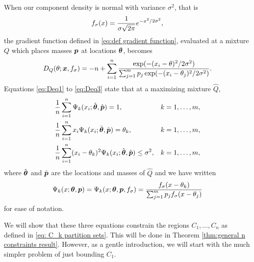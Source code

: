 	When our component density is normal with variance $\sigma^2$, that is
	\begin{equation}
		f_\sigma(x) = \frac{1}{\sigma \sqrt{2\pi}} e^{-x^2/2\sigma^2},
	\end{equation}
	the gradient function defined in \eqref{eq:def gradient function}, evaluated at a mixture $Q$ which places masses ${\bm{{p}}}$ at locations ${\bm{{\theta}}}$, becomes
	\begin{equation}
		D_Q(\theta; {\bm{{x}}}, f_\sigma) = - n + \sum_{i = 1}^n \frac{\exp({-(x_i - \theta)^2/2\sigma^2})}{\sum_{j=1}^m p_j \exp({-(x_i - \theta_j)^2/2\sigma^2})}.
	\end{equation}
	Equations \eqref{eq:Deq1} to \eqref{eq:Deq3} state that at a maximizing mixture $\hat{Q}$, 
	\begin{align}
		&\frac{1}{n} \sum_{i=1}^n \Psi_k(x_i;\hat{{\bm{{\theta}}}},\hat{{\bm{{p}}}}) = 1, &&k = 1,\dots, m, \label{eq:PsiEq1}\\
		&\frac{1}{n} \sum_{i=1}^n x_i \Psi_k(x_i;\hat{{\bm{{\theta}}}},\hat{{\bm{{p}}}}) = \theta_k, &&k = 1,\dots, m,\label{eq:PsiEq2}\\
		&\frac{1}{n} \sum_{i=1}^n (x_i - \theta_k)^2 \Psi_k(x_i;\hat{{\bm{{\theta}}}},\hat{{\bm{{p}}}}) \leq \sigma^2, &&k = 1,\dots, m,
		\label{eq:PsiEq3}
	\end{align}
	where $\hat{{\bm{{\theta}}}}$ and $\hat{{\bm{{p}}}}$ are the locations and masses of $\hat{Q}$ and we have written
	\begin{equation}{}
		\Psi_k(x;{\bm{{\theta}}},{\bm{{p}}}) = \Psi_k(x;{\bm{{\theta}}},{\bm{{p}}}, f_\sigma) = \frac{f_\sigma(x - \theta_k)}{\sum_{j=1}^m p_j f_\sigma(x - \theta_j)}
	\end{equation}
	for ease of notation. 

	We will show that these three equations constrain the regions $C_1, \dots, C_n$ as defined in \eqref{eq: C_k partition sets}. This will be done in Theorem \ref{thm:general n constraints result}. However, as a gentle introduction, we will start with the much simpler problem of just bounding $C_1$.

